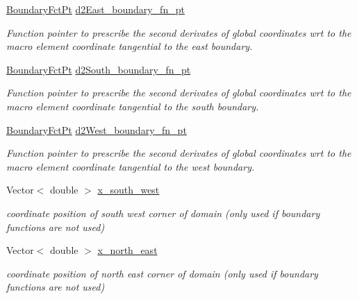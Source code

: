 \begin{DoxyCompactItemize}
\hyperlink{classoomph_1_1TopologicallyRectangularDomain_a8b2e24f5500d86c93aef509c5410e7cc}{Boundary\+Fct\+Pt} \hyperlink{classoomph_1_1TopologicallyRectangularDomain_a412d6225a5a6c3c55835e295e736d1c0}{d2\+East\+\_\+boundary\+\_\+fn\+\_\+pt}
\begin{DoxyCompactList}\small\item\em Function pointer to prescribe the second derivates of global coordinates wrt to the macro element coordinate tangential to the east boundary. \end{DoxyCompactList}\item 
\hyperlink{classoomph_1_1TopologicallyRectangularDomain_a8b2e24f5500d86c93aef509c5410e7cc}{Boundary\+Fct\+Pt} \hyperlink{classoomph_1_1TopologicallyRectangularDomain_a71020e52d5dd8cc0be51b9b466a294dc}{d2\+South\+\_\+boundary\+\_\+fn\+\_\+pt}
\begin{DoxyCompactList}\small\item\em Function pointer to prescribe the second derivates of global coordinates wrt to the macro element coordinate tangential to the south boundary. \end{DoxyCompactList}\item 
\hyperlink{classoomph_1_1TopologicallyRectangularDomain_a8b2e24f5500d86c93aef509c5410e7cc}{Boundary\+Fct\+Pt} \hyperlink{classoomph_1_1TopologicallyRectangularDomain_a55aaf2cfce3da535d9dd9ac5e990be3b}{d2\+West\+\_\+boundary\+\_\+fn\+\_\+pt}
\begin{DoxyCompactList}\small\item\em Function pointer to prescribe the second derivates of global coordinates wrt to the macro element coordinate tangential to the west boundary. \end{DoxyCompactList}\item 
Vector$<$ double $>$ \hyperlink{classoomph_1_1TopologicallyRectangularDomain_a2e58acf65777d33e580b4953b7753b45}{x\+\_\+south\+\_\+west}
\begin{DoxyCompactList}\small\item\em coordinate position of south west corner of domain (only used if boundary functions are not used) \end{DoxyCompactList}\item 
Vector$<$ double $>$ \hyperlink{classoomph_1_1TopologicallyRectangularDomain_aea8383a0d263080b49c3cbaee4af7833}{x\+\_\+north\+\_\+east}
\begin{DoxyCompactList}\small\item\em coordinate position of north east corner of domain (only used if boundary functions are not used) \end{DoxyCompactList}\end{DoxyCompactItemize}


